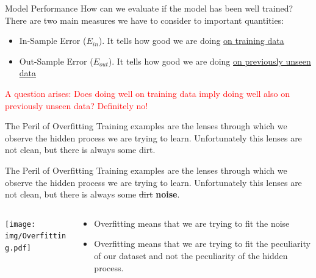 \documentclass{beamer}
\begin{document}
\begin{frame}{Model Performance}
\Large
How can we evaluate if the model has been well trained?
There are two main measures we have to consider to important quantities:
\vskip 0.8cm
\begin{itemize}
\item In-Sample Error ($E_{in}$). It tells how good we are doing \underline{on training data}
\item Out-Sample Error ($E_{out}$). It tells how good we are doing \underline{on previously unseen data}
\end{itemize}
\vskip 1cm
\pause
\textcolor{red}{A question arises: Does doing well on training data imply doing well also
on previously unseen data?
\pause
Definitely no!}
\end{frame}

\begin{frame}{The Peril of Overfitting}
\vskip -3cm
Training examples are the lenses through which we observe the hidden
process we are trying to learn. Unfortunately this lenses are not 
clean, but there is always some dirt.

\end{frame}


\begin{frame}{The Peril of Overfitting}
Training examples are the lenses through which we observe the hidden
process we are trying to learn. Unfortunately this lenses are not 
clean, but there is always some \st{dirt} \textbf{noise}.
\vskip 1cm
\begin{columns}
\begin{column}{0.5\textwidth}
\texttt{[image: img/Overfitting.pdf]}
\end{column}
\begin{column}{0.5\textwidth}

\begin{itemize}
\pause
\item Overfitting means that we are trying to fit the noise
\pause
\item Overfitting means that we are trying to fit the peculiarity of our dataset and not the peculiarity
of the hidden process.
\end{itemize}

\end{column}
\end{columns}
\end{frame}
\end{document}
